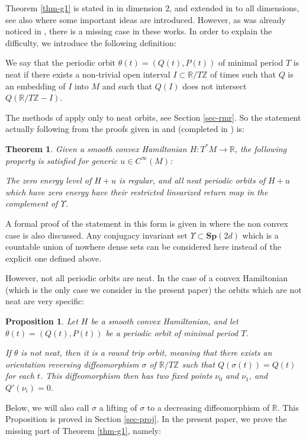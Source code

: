 \documentclass[10pt]{amsart}
\newcommand{\Rm}{\mathbb{R}}
\newcommand{\Zm}{\ensuremath{\mathbb{Z}}}
\newcommand{\Sp}{\mathbf{Sp}}
\theoremstyle{plain}
\newtheorem{thm}{Theorem}
\newtheorem{prop}[lem]{Proposition}
\theoremstyle{definition}
\begin{document}
Theorem \ref{thm-g1} is stated in \cite{O08} in dimension $2$, and extended in \cite{RR} to all dimensions, see also \cite{Co10}
where some important ideas are introduced. However, as was already noticed in \cite{AB2},
there is a missing case in these works.
In order to explain the difficulty, we introduce the following definition:

We say that the periodic orbit $\theta(t)=(Q(t), P(t))$ of minimal period $T$ is neat if there exists a non-trivial open interval $I\subset \Rm/T\Zm$ of times such that $Q$ is an embedding of $I$ into $M$ and such that
$Q(I)$ does not intersect $Q(\Rm/T\Zm-I)$.

The methods of \cite{O08,RR} apply only to neat orbits, see Section \ref{sec-rmr}. So the statement actually following from the proofs given in \cite{O08} and \cite{RR}
(completed in \cite{AB}) is:

\begin{thm}\label{thm-g2}
Given a smooth convex Hamiltonian $H: T^*M\rightarrow \Rm$,
the following property is satisfied for generic $u\in C^{\infty}(M)$:

The zero energy level of $H+u$ is regular, and all \emph{neat}
periodic orbits of $H+u$ which have zero energy have their restricted linearized
return map in the complement of $\Upsilon$.
\end{thm}

A formal proof of the statement in this form is given in \cite{AB2} where the non convex case is also discussed. Any
conjugacy invariant set $\Upsilon\subset \Sp(2d)$ which is a countable union of nowhere dense sets can be considered here instead of the explicit one defined above.

However, not all periodic orbits are neat.
In the case of a convex Hamiltonian (which is the only case we consider in the present paper) the orbits which are not neat are very specific:

\begin{prop}\label{prop-neat}
Let $H$ be a smooth convex Hamiltonian, and let $\theta(t)=(Q(t),P(t))$ be a periodic orbit of minimal period $T$.

If $\theta$ is not neat, then it is a \textit{round trip} orbit, meaning that
there exists an orientation reversing diffeomorphism $\sigma$ of $\Rm/T\Zm$ such that $Q(\sigma(t))=Q(t)$ for each $t$. This diffeomorphism then has two fixed points $\nu_0$ and $\nu_1$, and $Q'(\nu_i)=0$.
\end{prop}

Below, we will also call $\sigma$ a lifting of $\sigma$ to a decreasing diffeomorphism of $\Rm$.
This Proposition is proved in Section \ref{sec-proj}.
In the present paper, we prove the missing part of Theorem \ref{thm-g1}, namely:
\end{document}
